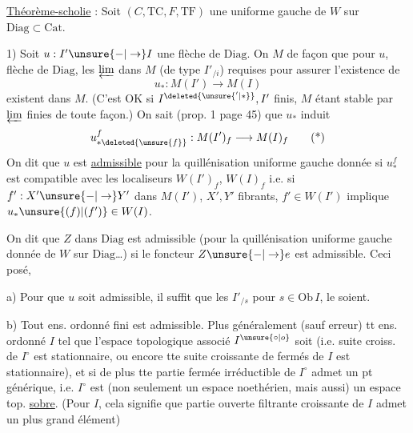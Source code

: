\uline{Théorème-scholie} : Soit $(C,\mathrm{TC},F,\mathrm{TF})$ une  uniforme gauche de $W$ sur $\mathrm{Diag}\subset\mathrm{Cat}$.

1) Soit $u:I'\unsure{-|\to}I$ une flèche de $\mathrm{Diag}$. On    $M$ de façon que pour $u$, flèche de $\mathrm{Diag}$, les $\varprojlim$ dans $M$  (de type $I'_{/i}$) requises pour assurer l'existence de
\[
u_*:M(I')\longrightarrow M(I)
\]
existent dans $M$. (C'est OK si $I^{\deleted{\unsure{'|*}}},I'$ finis, $M$ étant  stable par $\varprojlim$ finies de toute façon.) On sait (prop. 1 page 45) que $u_*$ induit
\[
u^{f}_{*\deleted{\unsure{f}}}:M(I')_f\longrightarrow M(I)_f
\tag*{(*)}
\]
On dit que $u$ est \uline{admissible}  pour la quillénisation uniforme gauche donnée  si $u^f_*$ est compatible avec les localiseurs $W(I')_f$, $W(I)_f$ i.e. si $f':X'\unsure{-|\to}Y'$ dans $M(I')$, $X',Y'$ \deleted{$\unsure{\in}$} fibrants, $f'\in W(I')$ implique $u_*\unsure{(f)|(f')}\in W(I)$.

On dit que $Z$ dans $\mathrm{Diag}$ est admissible (pour la quillénisation uniforme gauche donnée de $W$ sur $\mathrm{Diag}$\ldots) si le foncteur $Z\unsure{-|\to}e$ est admissible. Ceci posé,

a) Pour que $u$ soit admissible, il suffit que les $I'_{/s}$ pour $s\in\mathrm{Ob}\,I$, le soient.

b) Tout ens. ordonné fini est admissible. Plus généralement (sauf erreur) tt ens. ordonné $I$ tel que l'espace topologique associé  $I^{\unsure{\circ|o}}$ soit  (i.e.  suite croiss.  de $I^\circ$ est stationnaire, ou encore tte suite croissante de fermés de $I$ est stationnaire), et si de plus tte partie fermée irréductible de $I^\circ$ admet un pt générique, i.e. $I^\circ$ est (non seulement un espace noethérien, mais aussi) un espace top. \uline{sobre}. (Pour $I$, cela signifie que  partie ouverte filtrante croissante de $I$ admet un plus grand élément\deleted{\unsure{)}})

